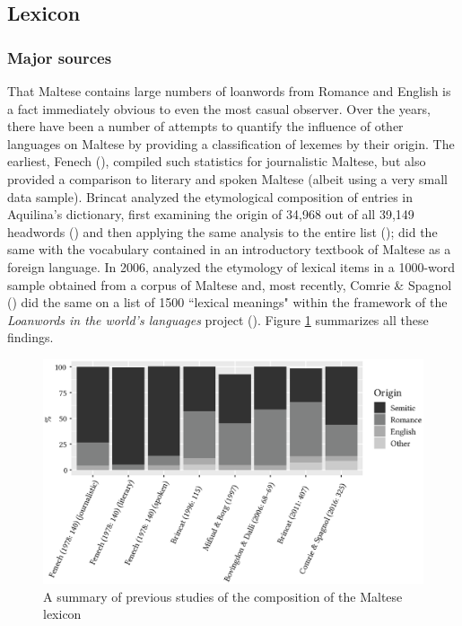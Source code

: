 \documentclass[output=paper]{langsci/langscibook}
\begin{document}


\subsection{Lexicon} \label{mtlexicon} %
\subsubsection{Major sources}
That Maltese contains large numbers of loanwords from Romance and English is a fact immediately obvious to even the most casual observer. Over the years, there have been a number of attempts to quantify the influence of other languages on Maltese by providing a classification of lexemes by their origin. The earliest, Fenech (\citeyear[216--217]{fenech1978}), compiled such statistics for journalistic Maltese, but also provided a comparison to literary and spoken Maltese (albeit using a very small data sample). Brincat analyzed the etymological composition of entries in Aquilina's dictionary, first examining the origin of 34,968 out of all 39,149 headwords (\citealt[115]{brincat1996}) and then applying the same analysis to the entire list (\citealt[407]{brincat2011});  \cite{mifsudborg1997} did the same with the vocabulary contained in an introductory textbook of Maltese as a foreign language. In 2006, \cite{bovingdondalli2006} analyzed the etymology of lexical items in a 1000-word sample obtained from a corpus of Maltese and, most recently, Comrie \& Spagnol (\citeyear[318]{comriespagnol2016}) did the same on a list of 1500 ``lexical meanings" within the framework of the \textit{Loanwords in the world’s languages} project (\citealt{HaspelmathTadmor2009}). Figure \ref{lexiconfig} summarizes all these findings.
\begin{figure}[H]
\centering
\includegraphics[width=12cm]{figures/lexiconnewfont.eps}
\caption{A summary of previous studies of the composition of the Maltese lexicon}
\label{lexiconfig}
\end{figure}
\end{document}
